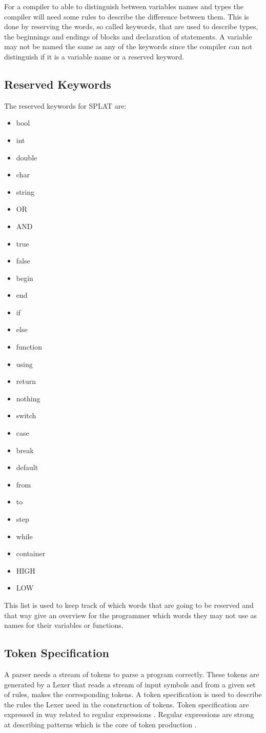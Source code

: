 For a compiler to able to distinguish between variables names and types the compiler will need some rules to describe the difference between them. This is done by reserving the words, so called keywords, that are used to describe types, the beginnings and endings of blocks and declaration of statements. A variable may not be named the same as any of the keywords since the compiler can not distinguish if it is a variable name or a reserved keyword.

\subsection{Reserved Keywords}
The reserved keywords for SPLAT are:
\begin{itemize}
\item bool
\item int
\item double
\item char
\item string
\item OR
\item AND
\item true
\item false
\item begin
\item end
\item if
\item else
\item function
\item using
\item return
\item nothing
\item switch
\item case
\item break
\item default
\item from
\item to
\item step
\item while
\item container
\item HIGH
\item LOW
\end{itemize}
This list is used to keep track of which words that are going to be reserved and that way give an overview for the programmer which words they may not use as names for their variables or functions. 

\subsection{Token Specification}
A parser needs a stream of tokens to parse a program correctly. These tokens are generated by a Lexer that reads a stream of input symbols and from a given set of rules, makes the corresponding tokens. A token specification is used to describe the rules the Lexer need in the construction of tokens. Token specification are expressed in way related to regular expressions \citep{sebasta}. Regular expressions are strong at describing patterns which is the core of token production \citep{sipser}.

